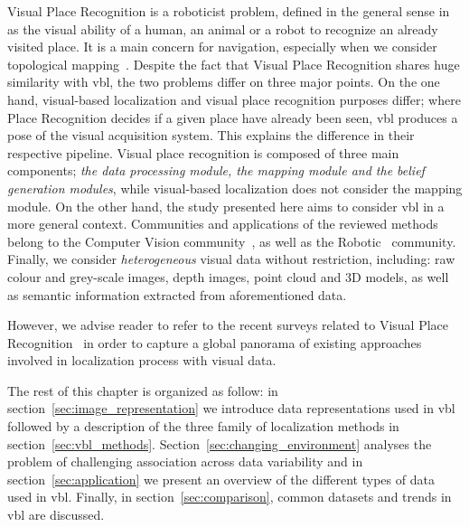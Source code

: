 		Visual Place Recognition is a roboticist problem, defined in the general sense in~\citep{Lowry2016} as the visual ability of a human, an animal or a robot to recognize an already visited place. It is a main concern for navigation, especially when we consider topological mapping~\citep{Garcia-Fidalgo2015}. Despite the fact that Visual Place Recognition shares huge similarity with \ac{vbl}, the two problems differ on three major points. On the one hand, visual-based localization and visual place recognition purposes differ; where Place Recognition decides if a given place have already been seen, \ac{vbl} produces a pose of the visual acquisition system. This explains the difference in their respective pipeline. Visual place recognition is composed of three main components; \textit{the data processing module, the mapping module and the belief generation modules}, while visual-based localization does not consider the mapping module. On the other hand, the study presented here aims to consider \ac{vbl} in a more general context. Communities and applications of the reviewed methods belong to the Computer Vision community~\citep{Sattler2011}, as well as the Robotic~\citep{Garcia-Fidalgo2015} community. Finally, we consider \textit{heterogeneous} visual data without restriction, including: raw colour and grey-scale images, depth images, point cloud and 3D models, as well as semantic information extracted from aforementioned data. 
	
		However, we advise reader to refer to the recent surveys related to Visual Place Recognition~\citep{Lowry2016,Garcia-Fidalgo2015,Kostavelis2015} in order to capture a global panorama of existing approaches involved in localization process with visual data.		

		\bigskip
		The rest of this chapter is organized as follow: in section~\ref{sec:image_representation} we introduce data representations used in \ac{vbl} followed by a description of the three family of localization methods in section~\ref{sec:vbl_methods}. Section~\ref{sec:changing_environment} analyses the problem of challenging association across data variability and in section~\ref{sec:application} we present an overview of the different types of data used in \ac{vbl}. Finally, in section~\ref{sec:comparison}, common datasets and trends in \ac{vbl} are discussed.